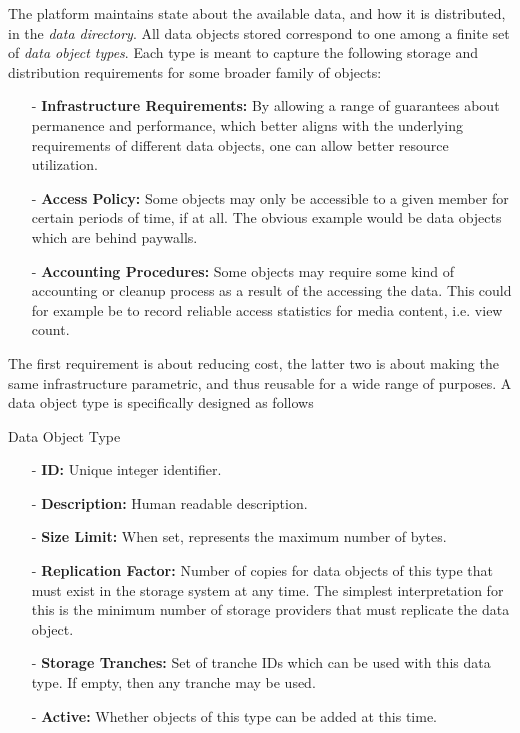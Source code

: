\documentclass{article}
\newenvironment{concept_box}[1]
    {
    \begin{tcolorbox}
    {\large \textbf{#1} }
    }
    {
    \end{tcolorbox}
    }
\begin{document}
The platform maintains state about the available data, and how it is distributed, in the \textit{data directory}. All data objects stored correspond to one among a finite set of \textit{data object types}. Each type is meant to capture the following storage and distribution requirements for some broader family of objects:

\begin{itemize}
  \item[-] \textbf{Infrastructure Requirements:} By allowing a range of guarantees about permanence and performance, which better aligns with the underlying requirements of different data objects, one can allow better resource utilization.

  \item[-] \textbf{Access Policy:} Some objects may only be accessible to a given member for certain periods of time, if at all. The obvious example would be data objects which are behind paywalls.

  \item[-] \textbf{Accounting Procedures:} Some objects may require some kind of accounting or cleanup process as a result of the accessing the data. This could for example be to record reliable access statistics for media content, i.e. view count.

\end{itemize}

The first requirement is about reducing cost, the latter two is about making the same infrastructure parametric, and thus reusable for a wide range of purposes. A data object type is specifically designed as follows  \\

\begin{concept_box}{Data Object Type}

\begin{itemize}
  \item[-] \textbf{ID:} Unique integer identifier.
  \item[-] \textbf{Description:} Human readable description.
  \item[-] \textbf{Size Limit:} When set, represents the maximum number of bytes.
  \item[-] \textbf{Replication Factor:} Number of copies for data objects of this type that must exist in the storage system at any time. The simplest interpretation for this is the minimum number of storage providers that must replicate the data object.
  \item[-] \textbf{Storage Tranches:} Set of tranche IDs which can be used with this data type. If empty, then any tranche may be used.
  \item[-] \textbf{Active:} Whether objects of this type can be added at this time.
\end{itemize}
\end{concept_box}
\end{document}
